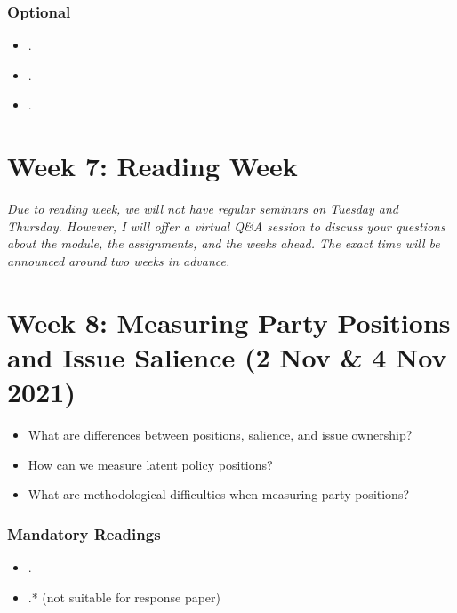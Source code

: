 \documentclass[abstract=on,parskip=full,headings=standardclasses,fontsize=11pt,paper=a4]{scrartcl}
\begin{document}
\subsubsection*{Optional}
\begin{itemize}
\item {}.
\item {}.
\item {}.
\end{itemize}

\section{Week 7:  Reading Week}

\textit{Due to reading week, we will not have regular seminars on Tuesday and Thursday. However, I will offer a virtual Q\&A session to discuss your questions about the module, the assignments, and the weeks ahead. The exact time will be announced around two weeks in advance.} 



\section{Week 8:  Measuring Party Positions and Issue Salience (2 Nov \& 4 Nov 2021)}


\begin{itemize}
\renewcommand\labelitemi{--}
\item What are differences between positions, salience, and issue ownership?
\item How can we measure latent policy positions? 
\item What are methodological difficulties when measuring party positions?
\end{itemize}

\subsubsection*{Mandatory Readings}
\begin{itemize}
\item {}.
\item {}.* (not suitable for response paper)
\end{itemize}
\end{document}
